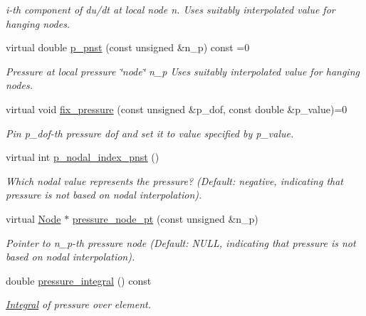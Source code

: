 \begin{DoxyCompactItemize}
\begin{DoxyCompactList}\small\item\em i-\/th component of du/dt at local node n. Uses suitably interpolated value for hanging nodes. \end{DoxyCompactList}\item 
virtual double \hyperlink{classoomph_1_1PolarNavierStokesEquations_a4db8f8149fe830b204de3c5f64fd3113}{p\+\_\+pnst} (const unsigned \&n\+\_\+p) const =0
\begin{DoxyCompactList}\small\item\em Pressure at local pressure \char`\"{}node\char`\"{} n\+\_\+p Uses suitably interpolated value for hanging nodes. \end{DoxyCompactList}\item 
virtual void \hyperlink{classoomph_1_1PolarNavierStokesEquations_a80333b602104b12993c7d3b242d2adfb}{fix\+\_\+pressure} (const unsigned \&p\+\_\+dof, const double \&p\+\_\+value)=0
\begin{DoxyCompactList}\small\item\em Pin p\+\_\+dof-\/th pressure dof and set it to value specified by p\+\_\+value. \end{DoxyCompactList}\item 
virtual int \hyperlink{classoomph_1_1PolarNavierStokesEquations_a79266ebf090ed45e71631e9c704f33a5}{p\+\_\+nodal\+\_\+index\+\_\+pnst} ()
\begin{DoxyCompactList}\small\item\em Which nodal value represents the pressure? (Default\+: negative, indicating that pressure is not based on nodal interpolation). \end{DoxyCompactList}\item 
virtual \hyperlink{classoomph_1_1Node}{Node} $\ast$ \hyperlink{classoomph_1_1PolarNavierStokesEquations_ae87e3863f67fb6cceb6b0e74a360febe}{pressure\+\_\+node\+\_\+pt} (const unsigned \&n\+\_\+p)
\begin{DoxyCompactList}\small\item\em Pointer to n\+\_\+p-\/th pressure node (Default\+: N\+U\+LL, indicating that pressure is not based on nodal interpolation). \end{DoxyCompactList}\item 
double \hyperlink{classoomph_1_1PolarNavierStokesEquations_ad95e0de64c45d54690bcc422cd17a1fc}{pressure\+\_\+integral} () const
\begin{DoxyCompactList}\small\item\em \hyperlink{classoomph_1_1Integral}{Integral} of pressure over element. \end{DoxyCompactList}\item 

\end{DoxyCompactItemize}
